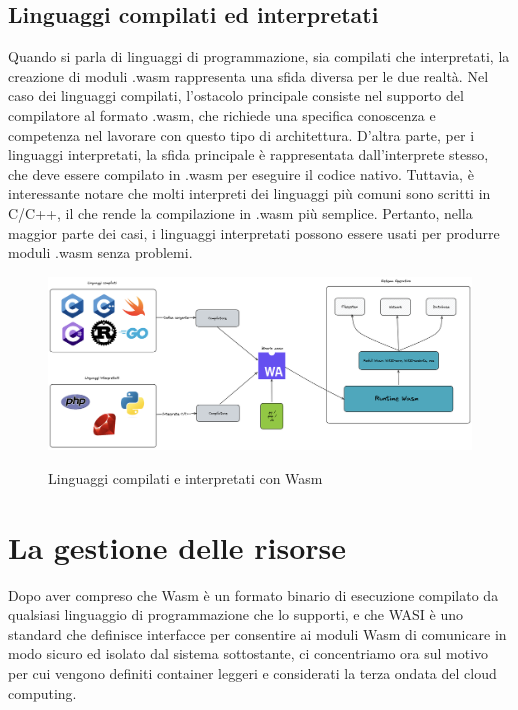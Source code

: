 \subsection{Linguaggi compilati ed interpretati}
Quando si parla di linguaggi di programmazione, sia compilati che interpretati, la creazione di moduli .wasm rappresenta
una sfida diversa per le due realtà. Nel caso dei linguaggi compilati, l'ostacolo principale consiste nel supporto del
compilatore al formato .wasm, che richiede una specifica conoscenza e competenza nel lavorare con questo tipo di
architettura. D'altra parte, per i linguaggi interpretati, la sfida principale è rappresentata dall'interprete stesso,
che deve essere compilato in .wasm per eseguire il codice nativo. Tuttavia, è interessante notare che molti interpreti
dei linguaggi più comuni sono scritti in C/C++, il che rende la compilazione in .wasm più semplice. Pertanto, nella
maggior parte dei casi, i linguaggi interpretati possono essere usati per produrre moduli .wasm senza problemi.

\begin{figure}[H]
    \centering
    \captionsetup{justification=centering}
    \includegraphics[width=15cm]{./chapters/2.wasi-in-depth/images/9.portability_wasm.png}
    \label{wasm_wasi_portability}
    \caption{Linguaggi compilati e interpretati con Wasm}
\end{figure}


\section{La gestione delle risorse}
Dopo aver compreso che Wasm è un formato binario di esecuzione compilato da qualsiasi linguaggio di programmazione che
lo supporti, e che WASI è uno standard che definisce interfacce per consentire ai moduli Wasm di comunicare in modo
sicuro ed isolato dal sistema sottostante, ci concentriamo ora sul motivo per cui vengono definiti container leggeri e
considerati la terza ondata del cloud computing.

